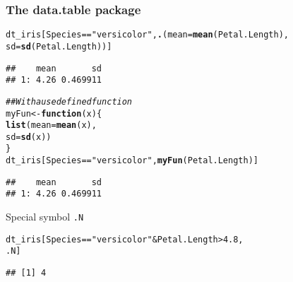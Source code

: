 \documentclass[paper=screen,mathserif]{beamer}\usepackage[]{graphicx}\usepackage[]{color}
\makeatletter
\newcommand{\hlnum}[1]{\textcolor[rgb]{0.686,0.059,0.569}{#1}}%
\newcommand{\hlstr}[1]{\textcolor[rgb]{0.192,0.494,0.8}{#1}}%
\newcommand{\hlcom}[1]{\textcolor[rgb]{0.678,0.584,0.686}{\textit{#1}}}%
\newcommand{\hlopt}[1]{\textcolor[rgb]{0,0,0}{#1}}%
\newcommand{\hlstd}[1]{\textcolor[rgb]{0.345,0.345,0.345}{#1}}%
\newcommand{\hlkwa}[1]{\textcolor[rgb]{0.161,0.373,0.58}{\textbf{#1}}}%
\newcommand{\hlkwb}[1]{\textcolor[rgb]{0.69,0.353,0.396}{#1}}%
\newcommand{\hlkwc}[1]{\textcolor[rgb]{0.333,0.667,0.333}{#1}}%
\newcommand{\hlkwd}[1]{\textcolor[rgb]{0.737,0.353,0.396}{\textbf{#1}}}%
\newenvironment{kframe}{%
 \def\at@end@of@kframe{}%
 \ifinner\ifhmode%
  \def\at@end@of@kframe{\end{minipage}}%
  \begin{minipage}{\columnwidth}%
 \fi\fi%
 \def\FrameCommand##1{\hskip\@totalleftmargin \hskip-\fboxsep
 \colorbox{shadecolor}{##1}\hskip-\fboxsep
     \hskip-\linewidth \hskip-\@totalleftmargin \hskip\columnwidth}%
 \MakeFramed {\advance\hsize-\width
   \@totalleftmargin\z@ \linewidth\hsize
   \@setminipage}}%
 {\par\unskip\endMakeFramed%
 \at@end@of@kframe}
\newenvironment{knitrout}{}{} %
\newcommand{\ft}[1]{\frametitle{#1}}
\makeatother
\begin{document}
\begin{frame}[fragile]
  \ft{The {\bf data.table} package}

\begin{knitrout}\scriptsize
{}\color{fgcolor}\begin{kframe}
\begin{alltt}
\hlstd{dt_iris[Species} \hlopt{==} \hlstr{"versicolor"}\hlstd{,} \hlkwd{.}\hlstd{(}\hlkwc{mean} \hlstd{=} \hlkwd{mean}\hlstd{(Petal.Length),}
        \hlkwc{sd} \hlstd{=} \hlkwd{sd}\hlstd{(Petal.Length))]}
\end{alltt}
\begin{verbatim}
##    mean       sd
## 1: 4.26 0.469911
\end{verbatim}
\begin{alltt}
\hlcom{## With a use defined function}
\hlstd{myFun} \hlkwb{<-} \hlkwa{function}\hlstd{(}\hlkwc{x}\hlstd{) \{}
    \hlkwd{list}\hlstd{(}\hlkwc{mean} \hlstd{=} \hlkwd{mean}\hlstd{(x),}
         \hlkwc{sd} \hlstd{=} \hlkwd{sd}\hlstd{(x))}
\hlstd{\}}
\hlstd{dt_iris[Species} \hlopt{==} \hlstr{"versicolor"}\hlstd{,} \hlkwd{myFun}\hlstd{(Petal.Length)]}
\end{alltt}
\begin{verbatim}
##    mean       sd
## 1: 4.26 0.469911
\end{verbatim}
\end{kframe}
\end{knitrout}

Special symbol {\tt .N}
\begin{knitrout}\scriptsize
{}\color{fgcolor}\begin{kframe}
\begin{alltt}
\hlstd{dt_iris[Species} \hlopt{==} \hlstr{"versicolor"} \hlopt{&} \hlstd{Petal.Length} \hlopt{>} \hlnum{4.8}\hlstd{,}
        \hlstd{.N]}
\end{alltt}
\begin{verbatim}
## [1] 4
\end{verbatim}
\end{kframe}
\end{knitrout}
\end{frame}
\end{document}
